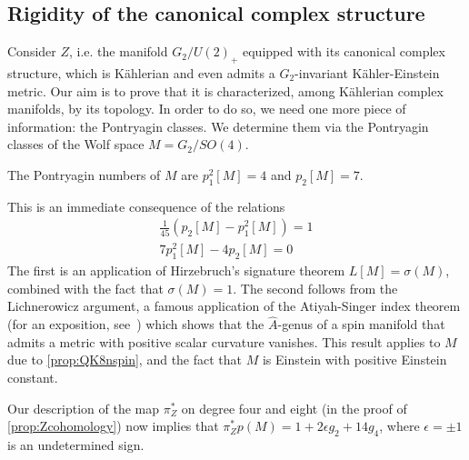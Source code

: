 \subsection{Rigidity of the canonical complex structure}

Consider $Z$, i.e. the manifold $G_2/U(2)_+$ equipped with its canonical complex structure, which is K\"ahlerian and even admits a $G_2$-invariant K\"ahler-Einstein metric. Our aim is to prove that it is characterized, among K\"ahlerian complex manifolds, by its topology. In order to do so, we need one more piece of information: the Pontryagin classes. We determine them via the Pontryagin classes of the Wolf space $M=G_2/SO(4)$.

\begin{lem}
	The Pontryagin numbers of $M$ are $p_1^2[M]=4$ and $p_2[M]=7$.
\end{lem}
\begin{myproof}
	This is an immediate consequence of the relations
	\begin{gather*}
		\frac{1}{45}(p_2[M]-p_1^2[M])=1\\ 
		7p_1^2[M]-4p_2[M]=0
	\end{gather*}
	The first is an application of Hirzebruch's signature theorem $L[M]=\sigma(M)$, combined with the fact that $\sigma(M)=1$. The second follows from the Lichnerowicz argument, a famous application of the Atiyah-Singer index theorem (for an exposition, see~\cite{Roe1998}) which shows that the $\hat A$-genus of a spin manifold that admits a metric with positive scalar curvature vanishes. This result applies to $M$ due to \cref{prop:QK8nspin}, and the fact that $M$ is Einstein with positive Einstein constant.
\end{myproof}

Our description of the map $\pi_Z^*$ on degree four and eight (in the proof of \cref{prop:Zcohomology}) now implies that $\pi_Z^*p(M)=1+2\epsilon g_2+14g_4$, where $\epsilon=\pm 1$ is an undetermined sign. 

